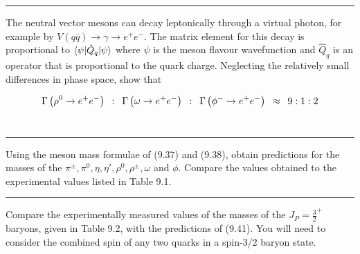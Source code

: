\noindent\rule{7in}{1.5pt}


\begin{problem}{9.5}
The neutral vector mesons can decay leptonically through a virtual photon, for example by $V(q\overbar{q}) \to \gamma \to e^+e^-$. The matrix element for this decay is proportional to $\braket{\psi|\hat{Q}_q|\psi}$ where $\psi$ is the meson flavour wavefunction and $\hat{Q}_q$ is an operator that is proportional to the quark charge. Neglecting the relatively small differences in phase space, show that

\begin{align*}
    \Gamma \left( \rho^0 \to e^+e^- \right) \hskip0.5em\relax  : \hskip0.5em\relax   \Gamma \left( \omega \to  e^+e^- \right) \hskip0.5em\relax : \hskip0.5em\relax   \Gamma \left( \phi^- \to e^+e^- \right) \hskip0.5em\relax \approx \hskip0.5em\relax 9:1:2
\end{align*}\\
\end{problem}
\begin{solution}

\end{solution}

\noindent\rule{7in}{1.5pt}


\begin{problem}{9.6}
Using the meson mass formulae of (9.37) and (9.38), obtain predictions for the masses of the $\pi^\pm , \pi^0 , \eta , \eta' , \rho^0 , \rho^\pm , \omega$ and $\phi$. Compare the values obtained to the experimental values listed in Table 9.1.
\end{problem}
\begin{solution}

\end{solution}

\noindent\rule{7in}{1.5pt}


\begin{problem}{9.7}
Compare the experimentally measured values of the masses of the $J_P = \frac{3}{2}^+ $ baryons, given in Table 9.2, with the predictions of (9.41). You will need to consider the combined spin of any two quarks in a spin-3/2 baryon state.
\end{problem}
\begin{solution}

\end{solution}

